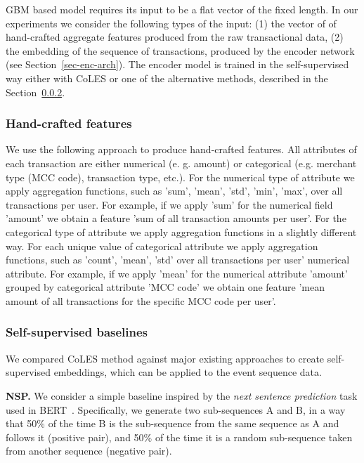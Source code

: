 \documentclass[sigconf, anonymous]{acmart}
\begin{document}
GBM based model requires its input to be a flat vector of the fixed length. In our experiments we consider the following types of the input: (1) the vector of of hand-crafted aggregate features produced from the raw transactional data, (2) the embedding of the sequence of transactions, produced by the encoder network (see Section~\ref{sec-enc-arch}). The encoder model is trained in the self-supervised way either with CoLES or one of the alternative methods, described in the Section~\ref{sec-ss-base}.
\subsubsection{Hand-crafted features} \label{sec-hand-features}

We use the following approach to produce hand-crafted features. All attributes of each transaction are either numerical (e. g. amount) or categorical (e.g. merchant type (MCC code), transaction type, etc.).
For the numerical type of attribute we apply aggregation functions, such as 'sum', 'mean', 'std', 'min', 'max', over all transactions per user. For example, if we apply 'sum' for the numerical field 'amount' we obtain a feature 'sum of all transaction amounts per user'. 
For the categorical type of attribute we apply aggregation functions in a slightly different way. For each unique value of categorical attribute we apply aggregation functions, such as 'count', 'mean', 'std' over all transactions per user' numerical attribute. For example, if we apply 'mean' for the numerical attribute 'amount' grouped by categorical attribute 'MCC code' we obtain one feature 'mean amount of all transactions for the specific MCC code per user'. 

\subsubsection{Self-supervised baselines} \label{sec-ss-base}

We compared CoLES method against major existing approaches to create self-supervised embeddings, which can be applied to the event sequence data.

\textbf{NSP.} We consider a simple baseline inspired by the \textit{next sentence prediction} task used in BERT~\citep{Devlin2019BERTPO}. Specifically, we generate two sub-sequences A and B, in a way that 50\% of the time B is the sub-sequence from the same sequence as A and follows it (positive pair), and 50\% of the time it is a random sub-sequence taken from another sequence (negative pair).
\end{document}
